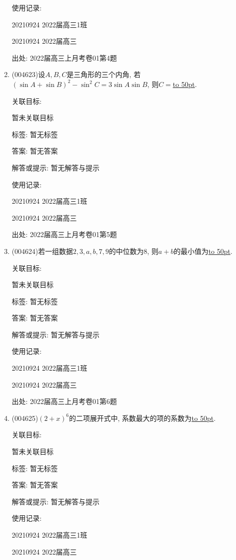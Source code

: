 \documentclass[10pt,a4paper]{article}
\newcommand{\blank}[1]{\underline{\hbox to #1pt{}}}
\begin{document}
\begin{enumerate}[1.]
使用记录:

20210924	2022届高三1班	

20210924	2022届高三	


出处: 2022届高三上月考卷01第4题
\item { (004623)}设$A,B,C$是三角形的三个内角, 若$(\sin A+\sin B)^2-{{\sin }^2}C=3\sin A\sin B$, 则$C=$\blank{50}.


关联目标:

暂未关联目标



标签: 暂无标签

答案: 暂无答案

解答或提示: 暂无解答与提示

使用记录:

20210924	2022届高三1班	

20210924	2022届高三	


出处: 2022届高三上月考卷01第5题
\item { (004624)}若一组数据$2,3,a,b,7,9$的中位数为$8$, 则$a+b$的最小值为\blank{50}.


关联目标:

暂未关联目标



标签: 暂无标签

答案: 暂无答案

解答或提示: 暂无解答与提示

使用记录:

20210924	2022届高三1班	

20210924	2022届高三	


出处: 2022届高三上月考卷01第6题
\item { (004625)}$(2+x)^6$的二项展开式中, 系数最大的项的系数为\blank{50}.


关联目标:

暂未关联目标



标签: 暂无标签

答案: 暂无答案

解答或提示: 暂无解答与提示

使用记录:

20210924	2022届高三1班	

20210924	2022届高三	



\end{enumerate}
\end{document}
